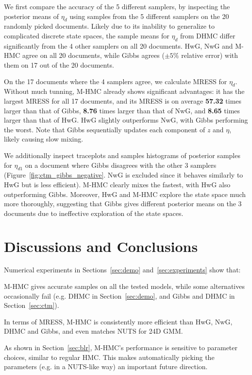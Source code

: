 \documentclass{article}
\begin{document}
We first compare the accuracy of the 5 different samplers, by inspecting the posterior means of $\eta_d$ using samples from the 5 different samplers on the 20 randomly picked documents. Likely due to its inability to generalize to complicated discrete state spaces, the sample means for $\eta_d$ from DHMC differ significantly from the 4 other samplers on all 20 documents. HwG, NwG and M-HMC agree on all 20 documents, while Gibbs agrees ($\pm5\%$ relative error) with them on 17 out of the 20 documents.

On the 17 documents where the 4 samplers agree, we calculate MRESS for $\eta_d$. Without much tunning, M-HMC already shows significant advantages: it has the largest MRESS for all 17 documents, and its MRESS is on average \textbf{57.32} times larger than that of Gibbs, \textbf{8.76} times larger than that of NwG, and \textbf{8.65} times larger than that of HwG. HwG slightly outperforms NwG, with Gibbs performing the worst. Note that Gibbs sequentially updates each component of $z$ and $\eta$, likely causing slow mixing.


We additionally inspect traceplots and samples histograms of posterior samples for $\eta_{d 1}$ on a document where Gibbs disagrees with the other 3 samplers (Figure~\ref{fig:ctm_gibbs_negative}. NwG is excluded since it behaves similarly to HwG but is less efficient). M-HMC clearly mixes the fastest, with HwG also outperforming Gibbs. Moreover, HwG and M-HMC explore the state space much more thoroughly, suggesting that Gibbs gives different posterior means on the 3 documents due to ineffective exploration of the state spaces.

\vspace*{-10pt}
\section{Discussions and Conclusions}\label{sec:discussions}
\vspace*{-10pt}
Numerical experiments in Sections~\ref{sec:demo} and~\ref{sec:experiments} show that:\begin{inparaenum}[(1)]
    \item M-HMC gives accurate samples on all the tested models, while some alternatives occasionally fail (e.g. DHMC in Section~\ref{sec:demo}, and Gibbs and DHMC in Section~\ref{sec:ctm}).
    \item In terms of MRESS, M-HMC is consistently more efficient than HwG, NwG, DHMC and Gibbs, and even matches NUTS for 24D GMM.
    \item As shown in Section~\ref{sec:blr}, M-HMC's performance is sensitive to parameter choices, similar to regular HMC. This makes automatically picking the parameters (e.g. in a NUTS-like way) an important future direction.
\end{inparaenum}
\end{document}
